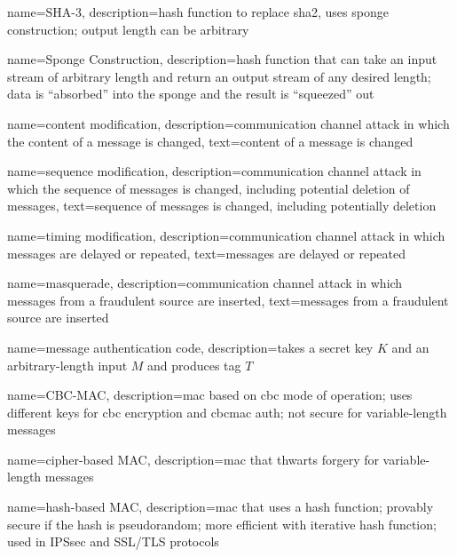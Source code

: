 {
    name={SHA-3},
    description={hash function to replace \gls{sha2}, uses \gls{sponge construction}; output length can be arbitrary}
}

{
    name={Sponge Construction},
    description={hash function that can take an input stream of arbitrary length and return an output stream of any desired length; data is ``absorbed'' into the sponge and the result is ``squeezed'' out}
}

{
    name={content modification},
    description={communication channel attack in which the content of a message is changed},
    text={content of a message is changed}
}

{
    name={sequence modification},
    description={communication channel attack in which the sequence of messages is changed, including potential deletion of messages},
    text={sequence of messages is changed, including potentially deletion}
}

{
    name={timing modification},
    description={communication channel attack in which messages are delayed or repeated},
    text={messages are delayed or repeated}
}

{
    name={masquerade},
    description={communication channel attack in which messages from a fraudulent source are inserted},
    text={messages from a fraudulent source are inserted}
}

{
    name={message authentication code},
    description={takes a secret key $K$ and an arbitrary-length input $M$ and produces tag $T$}
}

{
    name={CBC-MAC},
    description={\acrshort{mac} based on \acrfull{cbc} mode of operation; uses different keys for \acrshort*{cbc} encryption and \gls*{cbcmac} auth; not secure for variable-length messages}
}

{
    name={cipher-based MAC},
    description={\acrshort{mac} that thwarts forgery for variable-length messages}
}

{
    name={hash-based MAC},
    description={\acrshort{mac} that uses a hash function; provably secure if the hash is pseudorandom; more efficient with \gls{iterative hash function}; used in IPSsec and SSL/TLS protocols}
}


